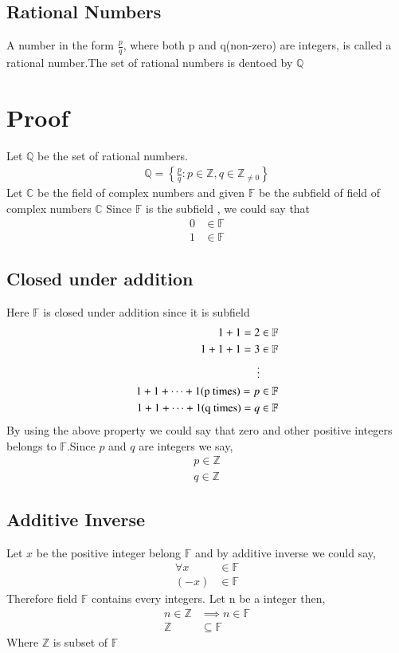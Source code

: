 \documentclass[journal,12pt,twocolumn]{IEEEtran}
\begin{document}
\subsection{Rational Numbers}
A number in the form $\frac{p}{q}$, where both p and q(non-zero) are integers, is called a rational number.The set of rational numbers is dentoed by $\mathbb{Q}$
\section{Proof}
Let $\mathbb{Q}$ be the set of rational numbers.
\begin{align}
    \mathbb{Q}=\left\{\frac{p}{q}:p \in \mathbb{Z},q \in \mathbb{Z}_{\not=0} \right\}\label{q}
\end{align}
Let $\mathbb{C}$ be the field of complex numbers and given $\mathbb{F}$ be the subfield of field of complex numbers $\mathbb{C}$ 
Since $\mathbb{F}$ is the subfield , we could say that 
\begin{align}
    0 &\in \mathbb{F} \label{0}\\
    1 &\in \mathbb{F}
\end{align}
\subsection{Closed under addition}
Here $\mathbb{F}$ is closed under addition since it is subfield
\begin{align}
    1+1=2&\in \mathbb{F}\\
    1+1+1=3&\in \mathbb{F}\\
    \vdots\notag\\
    1+1+\dots+1\text{(p times)}= p &\in \mathbb{F}\label{p}\\
    1+1+\dots+1\text{(q times)}= q &\in \mathbb{F}\label{q1}
\end{align}
By using the above property we could say that zero and other positive integers belongs to $\mathbb{F}$.Since $p$ and $q$ are integers we say,
\begin{align}
    p \in \mathbb{Z}\\
    q \in \mathbb{Z}\label{0}
\end{align}
\subsection{Additive Inverse}
Let $x$ be the positive integer belong $\mathbb{F}$ and by additive inverse we could say, 
\begin{align}
    \forall x &\in \mathbb{F}\label{1}\\
    (-x) &\in \mathbb{F} \label{2}
\end{align}
Therefore field $\mathbb{F}$ contains every integers. Let n be a integer then,
\begin{align}
    n \in \mathbb{Z} &\implies n \in \mathbb{F}\\
    \mathbb{Z} &\subseteq \mathbb{F}
\end{align}
Where $\mathbb{Z}$ is subset of $\mathbb{F}$
\end{document}
